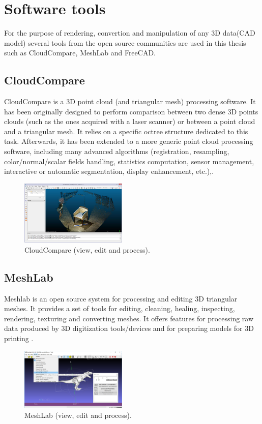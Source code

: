 \section{Software tools}
For the purpose of rendering, convertion and manipulation of any 3D data(CAD model) several tools from the open source communities are used in this thesis such as CloudCompare, MeshLab and FreeCAD. 

\subsection{CloudCompare}
CloudCompare is a 3D point cloud (and triangular mesh) processing software. It has been originally designed to perform comparison between two dense 3D points clouds (such as the ones acquired with a laser scanner) or between a point cloud and a triangular mesh. It relies on a specific octree structure dedicated to this task.  Afterwards, it has been extended to a more generic point cloud processing software, including many advanced algorithms (registration, resampling, color/normal/scalar fields handling, statistics computation, sensor management, interactive or automatic segmentation, display enhancement, etc.)\cite{cloudcompare},. 

\begin{figure}[!h]
\begin{center}
\includegraphics[width=2in]{figures02/cloudcompare.jpg}
\caption{CloudCompare (view, edit and process).}
\end{center}
\end{figure}


\subsection{MeshLab}
Meshlab is an open source system for processing and editing 3D triangular meshes.
It provides a set of tools for editing, cleaning, healing, inspecting, rendering, texturing and converting meshes. It offers features for processing raw data produced by 3D digitization tools/devices and for preparing models for 3D printing \cite{meshlab}.

 \begin{figure}[!h]
\begin{center}
\includegraphics[width=2in]{figures02/meshlab.png}
\caption{MeshLab (view, edit and process).}
\end{center}
\end{figure}


